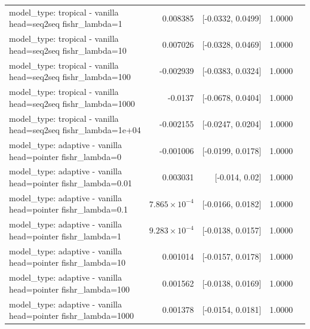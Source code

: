 \documentclass[10pt]{article}
\makeatletter
\newcommand{\stackcell}[1]{\begin{tabular}[t]{@{}l@{}}#1\end{tabular}}
\makeatother
\begin{document}
{\begin{longtable}{lrrrl}
\stackcell{model\_type: tropical - vanilla\\\footnotesize head=seq2seq fishr\_lambda=1 } & 0.008385 & [-0.0332, 0.0499] & 1.0000 & \\
\stackcell{model\_type: tropical - vanilla\\\footnotesize head=seq2seq fishr\_lambda=10 } & 0.007026 & [-0.0328, 0.0469] & 1.0000 & \\
\stackcell{model\_type: tropical - vanilla\\\footnotesize head=seq2seq fishr\_lambda=100 } & -0.002939 & [-0.0383, 0.0324] & 1.0000 & \\
\stackcell{model\_type: tropical - vanilla\\\footnotesize head=seq2seq fishr\_lambda=1000 } & -0.0137 & [-0.0678, 0.0404] & 1.0000 & \\
\stackcell{model\_type: tropical - vanilla\\\footnotesize head=seq2seq fishr\_lambda=1e+04 } & -0.002155 & [-0.0247, 0.0204] & 1.0000 & \\
\stackcell{model\_type: adaptive - vanilla\\\footnotesize head=pointer fishr\_lambda=0 } & -0.001006 & [-0.0199, 0.0178] & 1.0000 & \\
\stackcell{model\_type: adaptive - vanilla\\\footnotesize head=pointer fishr\_lambda=0.01 } & 0.003031 & [-0.014, 0.02] & 1.0000 & \\
\stackcell{model\_type: adaptive - vanilla\\\footnotesize head=pointer fishr\_lambda=0.1 } & $7.865\times10^{-4}$ & [-0.0166, 0.0182] & 1.0000 & \\
\stackcell{model\_type: adaptive - vanilla\\\footnotesize head=pointer fishr\_lambda=1 } & $9.283\times10^{-4}$ & [-0.0138, 0.0157] & 1.0000 & \\
\stackcell{model\_type: adaptive - vanilla\\\footnotesize head=pointer fishr\_lambda=10 } & 0.001014 & [-0.0157, 0.0178] & 1.0000 & \\
\stackcell{model\_type: adaptive - vanilla\\\footnotesize head=pointer fishr\_lambda=100 } & 0.001562 & [-0.0138, 0.0169] & 1.0000 & \\
\stackcell{model\_type: adaptive - vanilla\\\footnotesize head=pointer fishr\_lambda=1000 } & 0.001378 & [-0.0154, 0.0181] & 1.0000 & \\

\end{longtable}}
\end{document}

